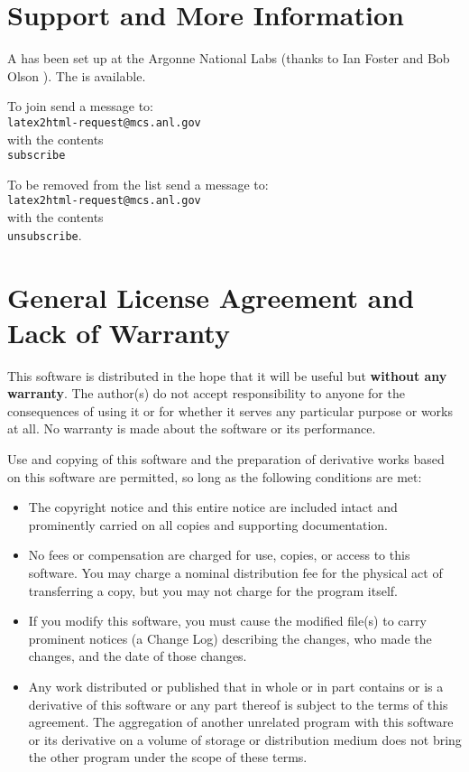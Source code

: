 
\section{Support and More Information}

A  has been set up at the
Argonne National Labs (thanks to Ian Foster 
 and Bob Olson ). The
 is
available.

To join send a message to: \\
\texttt{latex2html-request@mcs.anl.gov}  \\
with the contents \\
\texttt{subscribe}

To be removed from the list send a message to: \\
\texttt{latex2html-request@mcs.anl.gov}  \\
with the contents \\
\texttt{unsubscribe}.

\section{General License Agreement and Lack of Warranty}
This software is distributed in the hope that it will be useful
but \textbf{without any warranty}. The author(s) do not accept responsibility 
to anyone for the consequences of using it or for whether it serves 
any particular purpose or works at all. No warranty is made about 
the software or its performance. 
 
Use and copying of this software and the preparation of derivative
works based on this software are permitted, so long as the following
conditions are met:
\begin{itemize}
\item The copyright notice and this entire notice are included intact
and prominently carried on all copies and supporting documentation.
\item No fees or compensation are charged for use, copies, or
access to this software. You may charge a nominal
distribution fee for the physical act of transferring a
copy, but you may not charge for the program itself. 
\item If you modify this software, you must cause the modified
file(s) to carry prominent notices (a Change Log)
describing the changes, who made the changes, and the date
of those changes.
\item  Any work distributed or published that in whole or in part
contains or is a derivative of this software or any part 
thereof is subject to the terms of this agreement. The 
aggregation of another unrelated program with this software
or its derivative on a volume of storage or distribution
medium does not bring the other program under the scope
of these terms.
\end{itemize}
 
